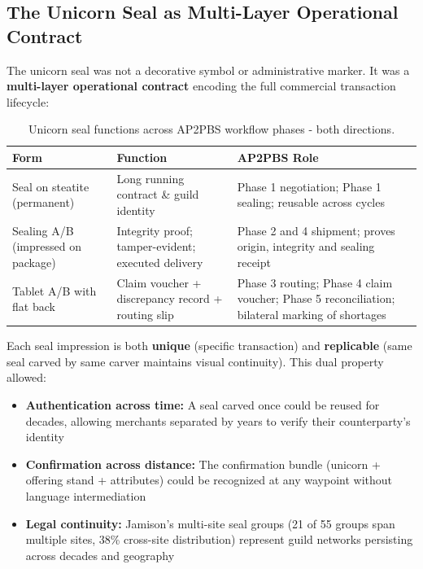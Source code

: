 \documentclass[12pt]{article}
\begin{document}
\subsection{The Unicorn Seal as Multi-Layer Operational Contract}

The unicorn seal was not a decorative symbol or administrative marker.
It was a \textbf{multi-layer operational contract} encoding the full commercial
transaction lifecycle:

\begin{table}[H]
\centering
\caption{Unicorn seal functions across AP2PBS workflow phases - both directions.}
\begin{tabular}{@{}p{3.5cm}p{5cm}p{5cm}@{}}
\toprule
\textbf{Form} & \textbf{Function} & \textbf{AP2PBS Role} \\
\midrule
Seal on steatite (permanent) & Long running contract \& guild identity & Phase
        1 negotiation; Phase 1 sealing; reusable across cycles \\
Sealing A/B (impressed on package) & Integrity proof; tamper-evident; executed
        delivery & Phase 2 and 4 shipment; proves origin, integrity and sealing receipt \\
Tablet A/B with flat back & Claim voucher + discrepancy record + routing slip
        & Phase 3 routing; Phase 4 claim voucher; Phase 5 reconciliation; bilateral marking of shortages \\
\bottomrule
\end{tabular}
\end{table}

Each seal impression is both \textbf{unique} (specific transaction) and
\textbf{replicable} (same seal carved by same carver maintains visual continuity).
This dual property allowed:

\begin{itemize}
\item \textbf{Authentication across time:} A seal carved once could be reused for
        decades, allowing merchants separated by years to verify their
        counterparty's identity
\item \textbf{Confirmation across distance:} The confirmation bundle (unicorn + offering
        stand + attributes) could be recognized at any waypoint without language
        intermediation
\item \textbf{Legal continuity:} Jamison's multi-site seal groups (21 of 55 groups
        span multiple sites, 38\% cross-site distribution) represent guild networks
        persisting across decades and geography
\end{itemize}
\end{document}
